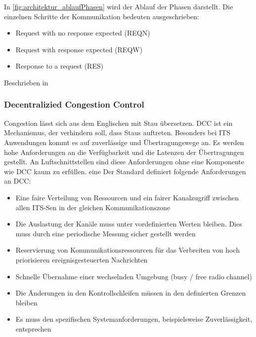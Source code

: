 In \autoref{fig:architektur_ablaufPhasen} wird der Ablauf der Phasen darstellt. Die einzelnen Schritte der Kommunikation bedeuten ausgeschrieben:
\begin{itemize}
	\item Request with no response expected (REQN)
	\item Request with response expected (REQW)
	\item Response to a request (RES)
\end{itemize}

Beschrieben in \cite{etsi102723-2}



\subsubsection{Decentralizied Congestion Control\label{architektur_dcc}}
Congestion lässt sich aus dem Englischen mit Stau übersetzen. \ac{DCC} ist ein Mechanismus, der verhindern soll, dass Staus auftreten. Besonders bei \ac{ITS} Anwendungen kommt es auf zuverlässige und Übertragungswege an. Es werden hohe Anforderungen an die Verfügbarkeit und die Latenzen der Übertragungen gestellt. An Luftschnittstellen sind diese Anforderungen ohne eine Komponente wie \ac{DCC} kaum zu erfüllen. eine Der Standard \cite{etsi102687} definiert folgende Anforderungen an \ac{DCC}:
\begin{itemize}
	\item Eine faire Verteilung von Ressourcen und ein fairer Kanalzugriff zwischen allen \ac{ITS-S}en in der gleichen Kommunikationszone
	\item Die Auslastung der Kanäle muss unter vordefinierten Werten bleiben. Dies muss durch eine periodische Messung sicher gestellt werden
	\item Reservierung von Kommunikationsressourcen für das Verbreiten von hoch priorisieren ereignisgesteuerten Nachrichten
	\item Schnelle Übernahme einer wechselnden Umgebung (busy / free radio channel)
	\item Die Änderungen in den Kontrollschleifen müssen in den definierten Grenzen bleiben
	\item Es muss den spezifischen Systemanforderungen, beispielsweise Zuverlässigkeit, entsprechen
\end{itemize}

